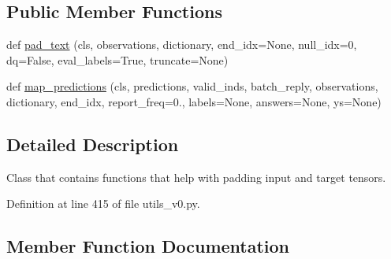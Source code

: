 \subsection*{Public Member Functions}
\begin{DoxyCompactItemize}
\item 
def \hyperlink{classparlai_1_1agents_1_1legacy__agents_1_1seq2seq_1_1utils__v0_1_1PaddingUtils_ae7f9ca3d9fd7dd823895a28af6cae34f}{pad\+\_\+text} (cls, observations, dictionary, end\+\_\+idx=None, null\+\_\+idx=0, dq=False, eval\+\_\+labels=True, truncate=None)
\item 
def \hyperlink{classparlai_1_1agents_1_1legacy__agents_1_1seq2seq_1_1utils__v0_1_1PaddingUtils_ae2c46f2f424e4301873e1c5bc201646c}{map\+\_\+predictions} (cls, predictions, valid\+\_\+inds, batch\+\_\+reply, observations, dictionary, end\+\_\+idx, report\+\_\+freq=0., labels=None, answers=None, ys=None)
\end{DoxyCompactItemize}


\subsection{Detailed Description}
\begin{DoxyVerb}Class that contains functions that help with padding input and target tensors.
\end{DoxyVerb}
 

Definition at line 415 of file utils\+\_\+v0.\+py.



\subsection{Member Function Documentation}
\mbox{\label{classparlai_1_1agents_1_1legacy__agents_1_1seq2seq_1_1utils__v0_1_1PaddingUtils_ae2c46f2f424e4301873e1c5bc201646c}} 
